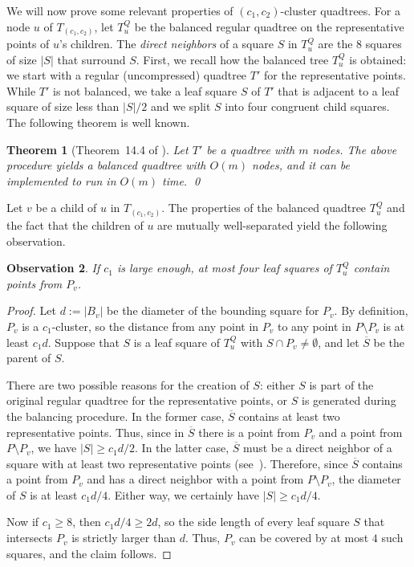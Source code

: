 \documentclass[11pt]{paper}
\newcommand {\eqdef} {:=}
\newtheorem {theorem} {Theorem}[section]
\newtheorem {observation}[theorem] {Observation}
\begin{document}
      
      We will now prove some relevant properties of $(c_1,c_2)$-cluster
      quadtrees. 
      For a node $u$ of $T_{(c_1,c_2)}$, let $T^Q_u$ be the balanced regular 
      quadtree on the representative points of $u$'s children.
      The \emph{direct neighbors} of a square $S$ in $T_u^Q$ 
      are the $8$ squares of size $|S|$ that surround $S$.
      First, we recall how the balanced tree $T^Q_u$ is obtained: we start with
      a regular (uncompressed) quadtree $T'$ for the representative points.
      While $T'$ is not balanced, we take a leaf square $S$ of $T'$ that
      is adjacent to a leaf square of size less than $|S|/2$ and
      we split $S$ into four congruent child squares. The following
      theorem is well known.
     \begin {theorem} [Theorem~14.4 of \cite{deBergChvKrOv08}]
    \label {thm:balance}
      Let $T'$ be a quadtree with $m$ nodes. 
      The above procedure yields a balanced
      quadtree with $O(m)$ nodes, and it can be implemented
      to run in $O(m)$ time.
      \qed
    \end {theorem}

     
    Let $v$ be a child of $u$ in $T_{(c_1,c_2)}$.
    The properties of the balanced quadtree $T_u^Q$ and the
    fact that the children of $u$ are mutually well-separated yield 
    the following observation.
    
      \begin {observation} \label {obs:close}
        If $c_1$ is large enough,
        at most four leaf squares of $T^Q_u$ contain points from $P_v$.
      \end {observation}
      
      \begin {proof}
        Let $d \eqdef |B_v|$ be the diameter of the bounding square for 
	$P_v$. By definition, $P_v$ is a $c_1$-cluster,
        so the distance from any point in $P_v$ to any point
        in $P \setminus P_v$ is at least $c_1d$.
	Suppose that $S$ is a leaf square of $T^Q_u$ with
	$S \cap P_v \neq \emptyset$, and let $\overline{S}$ be the parent of $S$.

	There are two possible reasons for the creation of $S$:
	either $S$ is part of the original regular quadtree for
	the representative points, or $S$ is generated during the
	balancing procedure.
	 In the former case, 
	$\overline{S}$ contains at least two representative points.  
	Thus, since in $\overline{S}$ there is a point from $P_v$ and 
	a point from $P \setminus P_v$,
	we have $|S| \geq c_1d/2$. In the latter case, 
	$\overline{S}$ must be a direct neighbor of a square with
	at least two representative points 
	(see~\cite[Proof of Theorem~14.4]{deBergChvKrOv08}).
	Therefore, since $\overline{S}$  contains
	a point from $P_v$ and has a direct neighbor with a point
	from $P \setminus P_v$, the diameter of $S$ is at least
	$c_1d/4$. Either way, we certainly have 
	$|S| \geq c_1d/4$.

        Now if $c_1 \geq 8$, then $c_1d/4 \geq 2d$, so the side length
	of every leaf square $S$ that intersects $P_v$ is strictly larger than
	$d$. Thus, $P_v$ can be covered by at most $4$ such squares,
	and the claim follows. 
      \end{proof}
\end{document}
